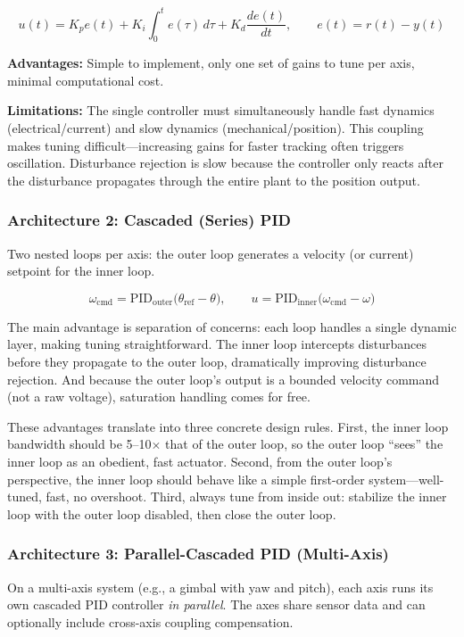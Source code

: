 \[
u(t) = K_p e(t) + K_i \int_0^t e(\tau)\,d\tau + K_d \frac{de(t)}{dt}, \qquad e(t) = r(t) - y(t)
\]

\textbf{Advantages:} Simple to implement, only one set of gains to tune per axis, minimal computational cost.

\textbf{Limitations:} The single controller must simultaneously handle fast dynamics (electrical/current) and slow dynamics (mechanical/position). This coupling makes tuning difficult---increasing gains for faster tracking often triggers oscillation. Disturbance rejection is slow because the controller only reacts after the disturbance propagates through the entire plant to the position output.

\subsubsection{Architecture 2: Cascaded (Series) PID}

Two nested loops per axis: the outer loop generates a velocity (or current) setpoint for the inner loop.

\[
\omega_{\text{cmd}} = \text{PID}_{\text{outer}}\bigl(\theta_{\text{ref}} - \theta\bigr), \qquad
u = \text{PID}_{\text{inner}}\bigl(\omega_{\text{cmd}} - \omega\bigr)
\]

The main advantage is separation of concerns: each loop handles a single dynamic layer, making tuning straightforward. The inner loop intercepts disturbances before they propagate to the outer loop, dramatically improving disturbance rejection. And because the outer loop's output is a bounded velocity command (not a raw voltage), saturation handling comes for free.

These advantages translate into three concrete design rules. First, the inner loop bandwidth should be 5--10$\times$ that of the outer loop, so the outer loop ``sees'' the inner loop as an obedient, fast actuator. Second, from the outer loop's perspective, the inner loop should behave like a simple first-order system---well-tuned, fast, no overshoot. Third, always tune from inside out: stabilize the inner loop with the outer loop disabled, then close the outer loop.

\subsubsection{Architecture 3: Parallel-Cascaded PID (Multi-Axis)}

On a multi-axis system (e.g., a gimbal with yaw and pitch), each axis runs its own cascaded PID controller \textit{in parallel}. The axes share sensor data and can optionally include cross-axis coupling compensation.

